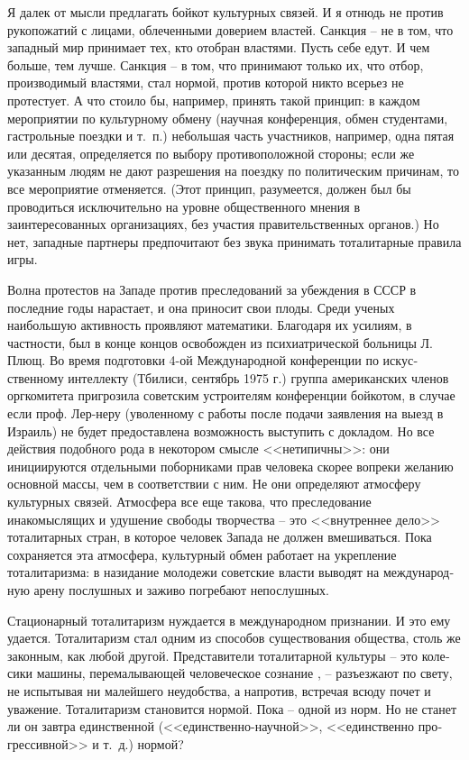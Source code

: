 \documentclass{book}
\begin{document}
Я далек от мысли предлагать бойкот культурных связей. И я отнюдь не против рукопожатий с лицами, облеченными доверием властей. Санкция -- не в том, что западный мир прини­мает тех, кто отобран властями. Пусть себе едут. И чем боль­ше, тем лучше. Санкция -- в том, что принимают только их, что отбор, производимый властями, стал нормой, против кото­рой никто всерьез не протестует. А что стоило бы, например, принять такой принцип: в каждом мероприятии по культур­ному обмену (научная конференция, обмен студентами, га­строльные поездки и т.~п.) небольшая часть участников, напри­мер, одна пятая или десятая, определяется по выбору проти­воположной стороны; если же указанным людям не дают раз­решения на поездку по политическим причинам, то все меро­приятие отменяется. (Этот принцип, разумеется, должен был бы проводиться исключительно на уровне общественного мне­ния в заинтересованных организациях, без участия правитель­ственных органов.) Но нет, западные партнеры предпочитают без звука принимать тоталитарные правила 
игры.

Волна протестов на Западе против преследований за убеж­дения в СССР в последние годы нарастает, и она приносит свои плоды. Среди ученых наибольшую активность проявляют мате­матики. Благодаря их усилиям, в частности, был в конце кон­цов освобожден из психиатрической больницы Л. Плющ. Во время подготовки 4-ой Международной конференции по искус­ственному интеллекту (Тбилиси, сентябрь 1975 г.) группа американских членов оргкомитета пригрозила советским уст­роителям конференции бойкотом, в случае если проф. Лер-неру (уволенному с работы после подачи заявления на выезд в Израиль) не будет предоставлена возможность выступить с докладом. Но все действия подобного рода в некотором смыс­ле <<нетипичны>>: они инициируются отдельными поборниками прав человека скорее вопреки желанию основной массы, чем в соответствии с ним. Не они определяют атмосферу культур­ных связей. Атмосфера все еще такова, что преследование инакомыслящих и удушение свободы творчества -- это <<внут­реннее дело>> тоталитарных стран, в которое 
человек 
Запада не должен вмешиваться. Пока сохраняется эта атмосфера, культурный обмен работает на укрепление тоталитаризма: в назидание молодежи советские власти выводят на международ­ную арену послушных и заживо погребают непослушных.

Стационарный тоталитаризм нуждается в международном признании. И это ему удается. Тоталитаризм стал одним из спо­собов существования общества, столь же законным, как лю­бой другой. Представители тоталитарной культуры -- это коле­сики машины, перемалывающей человеческое сознание , -- разъез­жают по свету, не испытывая ни малейшего неудобства, а на­против, встречая всюду почет и уважение. Тоталитаризм стано­вится нормой. Пока -- одной из норм. Но не станет ли он завт­ра единственной  (<<единственно-научной>>, <<единственно про­грессивной>> и т.~д.) нормой?
\end{document}
